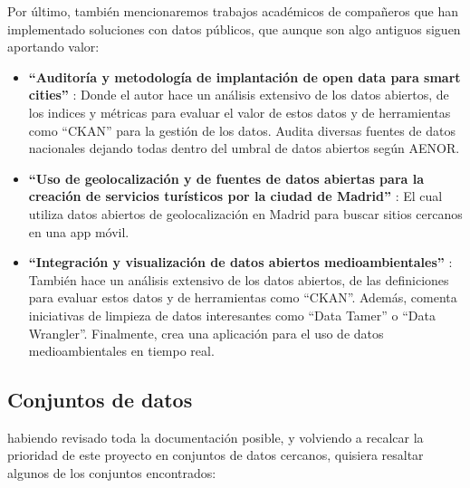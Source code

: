 	Por último, también mencionaremos trabajos académicos de compañeros que han implementado soluciones con datos públicos, que aunque son algo antiguos siguen aportando valor:
	
	\begin{itemize}
			\item \textbf{``Auditoría y metodología de implantación de open data para smart cities''} \citep{MelendrezMoreto2016Auditoria}: Donde el autor hace un análisis extensivo de los datos abiertos, de los indices y métricas para evaluar el valor de estos datos y de herramientas como ``CKAN'' para la gestión de los datos. Audita diversas fuentes de datos nacionales dejando todas dentro del umbral de datos abiertos según AENOR. 
			
			\item \textbf{``Uso de geolocalización y de fuentes de datos abiertas para la creación de servicios turísticos por la ciudad de Madrid''} \citep{LLamoccaPortela2016Integracion}: El cual utiliza datos abiertos de geolocalización en Madrid para buscar sitios cercanos en una app móvil.
			
			\item \textbf{``Integración y visualización de datos abiertos medioambientales''} \citep{ArellanoBruno2019UsoDeGeolocalizacion}: También hace un análisis extensivo de los datos abiertos, de las definiciones para evaluar estos datos y de herramientas como ``CKAN''. Además, comenta iniciativas de limpieza de datos interesantes como ``Data Tamer'' o ``Data Wrangler''. Finalmente, crea una aplicación para el uso de datos medioambientales en tiempo real. \\
	\end{itemize} 
	
	\subsection{Conjuntos de datos}
	
	habiendo revisado toda la documentación posible, y volviendo a recalcar la prioridad de este proyecto en conjuntos de datos cercanos, quisiera resaltar algunos de los conjuntos encontrados:
	
